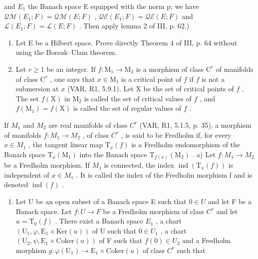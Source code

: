 and \(E_{1}\) the Banach space E equipped with the norm p; we have \(\mathcal{Q}\mathcal{M}(E_{1};F)=\mathcal{Q}\mathcal{M}(E;F)\) , \(\mathcal{Q}\mathcal{E}(E_{1};F)=\mathcal{Q}\mathcal{E}(E;F)\) and \(\mathcal{L}(E_{1};F)=\mathcal{L}(E;F)\) . Then apply lemma 2 of III, p. 62.)

\begin{enumerate}
\def\labelenumi{\arabic{enumi})}
\setcounter{enumi}{7}
\item
  Let E be a Hilbert space. Prove directly Theorem 4 of III, p. 64 without using the Borsuk--Ulam theorem.
\item
  Let \(r \geqslant 1\) be an integer. If \(f: \mathrm{M}_1 \to \mathrm{M}_2\) is a morphism of class \(\mathrm{C}^r\) of manifolds of class \(\mathrm{C}^r\) , one says that \(x \in \mathrm{M}_1\) is a critical point of \(f\) if \(f\) is not a submersion at \(x\) (VAR, R1, 5.9.1). Let X be the set of critical points of \(f\) . The set \(f(\mathrm{X})\) in \(\mathrm{M}_2\) is called the set of critical values of \(f\) , and \(f(\mathrm{M}_1) = f(\mathrm{X})\) is called the set of regular values of \(f\) .
\end{enumerate}

If \(M_{1}\) and \(M_{2}\) are real manifolds of class \(C^{r}\) (VAR, R1, 5.1.5, p. 35), a morphism of manifolds \(f: M_{1} \to M_{2}\) , of class \(C^{r}\) , is said to be Fredholm if, for every \(x \in M_{1}\) , the tangent linear map \(\mathrm{T}_{x}(f)\) is a Fredholm endomorphism of the Banach space \(\mathrm{T}_{x}(\mathrm{M}_{1})\) into the Banach space \(\mathrm{T}_{f(x)}(\mathrm{M}_{2})\) . a) Let \(f: M_{1} \to M_{2}\) be a Fredholm morphism. If \(M_{1}\) is connected, the index \(\operatorname{ind}(\mathrm{T}_{x}(f))\) is independent of \(x \in M_{1}\) . It is called the index of the Fredholm morphism f and is denoted \(\operatorname{ind}(f)\) .

\begin{enumerate}
\def\labelenumi{\alph{enumi})}
\setcounter{enumi}{1}
\tightlist
\item
  Let U be an open subset of a Banach space E such that \(0 \in U\) and let F be a Banach space. Let \(f: U \to F\) be a Fredholm morphism of class \(C^{r}\) and let \(u = \mathrm{T}_{0}(f)\) . There exist a Banach space \(E_{1}\) , a chart \((\mathrm{U}_{1}, \varphi, \mathrm{E}_{1} \times \mathrm{Ker}(u))\) of U such that \(0 \in U_{1}\) , a chart \((\mathrm{U}_{2}, \psi, \mathrm{E}_{1} \times \mathrm{Coker}(u))\) of F such that \(f(0) \in U_{2}\) and a Fredholm morphism \(g: \varphi(\mathrm{U}_{1}) \to \mathrm{E}_{1} \times \mathrm{Coker}(u)\) of class \(C^{r}\) such that
\end{enumerate}

